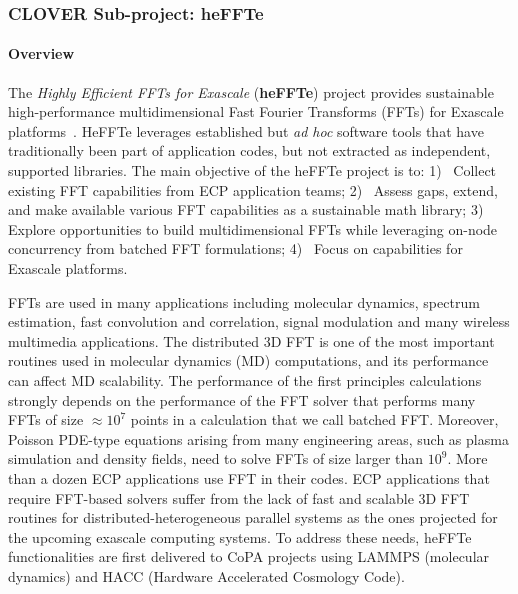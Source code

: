 \subsubsection{ CLOVER Sub-project: heFFTe}\label{subsubsect:fftecp}


\paragraph{Overview}

The {\it Highly Efficient FFTs for Exascale} ({\bf heFFTe}) project provides sustainable 
high-performance multidimensional Fast Fourier Transforms (FFTs) for Exascale 
platforms~\cite{thasd19,heffte-iccs20}.
HeFFTe leverages established but {\it ad hoc} 
software tools that have traditionally been part of application 
codes, but not extracted as independent, supported libraries. 
%
The main objective of the heFFTe project is to:
1)~ 
      Collect existing FFT capabilities from ECP 
      application teams;
2)~
      Assess gaps, extend, and make available various FFT
      capabilities as a sustainable math library;
3)~      
      Explore opportunities to build multidimensional FFTs
      while leveraging on-node concurrency from 
      batched FFT formulations;
4)~
      Focus on capabilities for Exascale platforms.

FFTs are used in many applications including molecular dynamics, 
spectrum estimation, fast convolution and correlation, signal 
modulation and many wireless multimedia applications. The 
distributed 3D FFT is one of the most important routines used 
in molecular dynamics (MD) computations, and its performance can 
affect MD scalability. The performance of the first 
principles calculations strongly depends on the performance of the 
FFT solver that performs many FFTs of size $\approx 10^7$ points in 
a calculation that we call batched FFT. Moreover, Poisson PDE-type 
equations arising from many engineering areas, such as plasma
simulation and density fields, need to solve FFTs of size larger than $10^9$. 
%
More than a dozen ECP applications use FFT in their codes.
ECP applications that require FFT-based solvers suffer from the lack of 
fast and scalable 3D FFT routines for distributed-heterogeneous parallel 
systems as the ones projected for the upcoming exascale computing systems. 
To address these needs, heFFTe functionalities are first delivered 
to CoPA projects using LAMMPS (molecular dynamics) and HACC (Hardware Accelerated
Cosmology Code).

